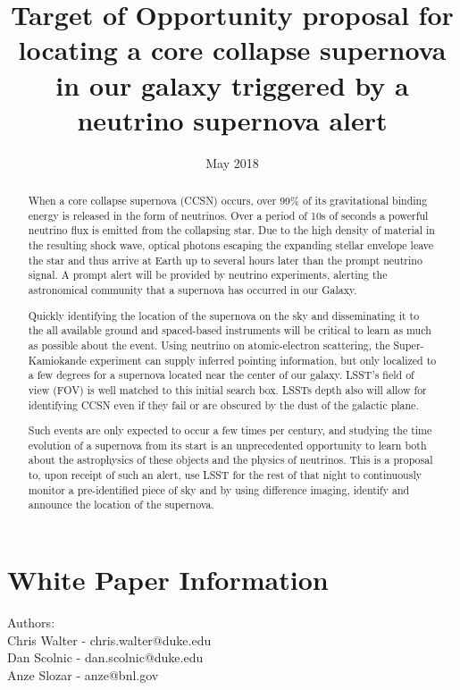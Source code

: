 \documentclass[11pt]{article}
\title{Target of Opportunity proposal for locating a core collapse
  supernova in our galaxy triggered by a neutrino supernova alert}
\author{} \date{May 2018}
\begin{document}
\maketitle

\begin{abstract}

  When a core collapse supernova (CCSN) occurs, over 99\% of its
  gravitational binding energy is released in the form of neutrinos.
  Over a period of 10s of seconds a powerful neutrino flux is emitted
  from the collapsing star.  Due to the high density of material in
  the resulting shock wave, optical photons escaping the expanding
  stellar envelope leave the star and thus arrive at Earth up to
  several hours later than the prompt neutrino signal.  A prompt alert
  will be provided by neutrino experiments, alerting the astronomical
  community that a supernova has occurred in our Galaxy.

  Quickly identifying the location of the supernova on the sky and
  disseminating it to the all available ground and spaced-based
  instruments will be critical to learn as much as possible about the
  event. Using neutrino on atomic-electron scattering, the
  Super-Kamiokande experiment can supply inferred pointing information,
  but only localized to a few degrees for a supernova located near
  the center of our galaxy.  LSST's field of view (FOV) is well
  matched to this initial search box.  LSSTs depth also will allow for
  identifying CCSN even if they fail or are obscured by the dust of
  the galactic plane.

  Such events are only expected to occur a few times per century, and
  studying the time evolution of a supernova from its start is an
  unprecedented opportunity to learn both about the astrophysics of
  these objects and the physics of neutrinos.  This is a proposal
  to, upon receipt of such an alert, use LSST for the rest of that
  night to continuously monitor a pre-identified piece of sky and by
  using difference imaging, identify and announce the location of the
  supernova.
  
\end{abstract}

\section{White Paper Information}

\noindent
Authors: \\

\noindent
Chris Walter - chris.walter@duke.edu \\
Dan Scolnic - dan.scolnic@duke.edu \\
Anze Slozar - anze@bnl.gov \\
\end{document}
